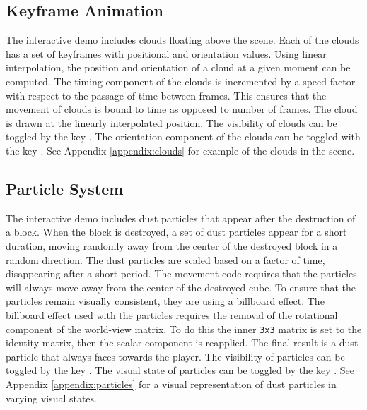 \documentclass[a4paper,11pt,titlepage]{scrartcl}
\begin{document}
\subsection{Keyframe Animation}
\label{section:animation}
The interactive demo includes clouds floating above the scene.  Each of the clouds has a set of keyframes with positional and orientation values.  Using linear interpolation, the position and orientation of a cloud at a given moment can be computed.  The timing component of the clouds is incremented by a speed factor with respect to the passage of time between frames.  This ensures that the movement of clouds is bound to time as opposed to number of frames.  The cloud is drawn at the linearly interpolated position.
\vskip 2.5mm\noindent
The visibility of clouds can be toggled by the key .  The orientation component of the clouds can be toggled with the key .  See Appendix \ref{appendix:clouds} for example of the clouds in the scene.

\subsection{Particle System}
\label{section:particles}
The interactive demo includes dust particles that appear after the destruction of a block.  When the block is destroyed, a set of dust particles appear for a short duration, moving randomly away from the center of the destroyed block in a random direction.  The dust particles are scaled based on a factor of time, disappearing after a short period.  The movement code requires that the particles will always move away from the center of the destroyed cube.  To ensure that the particles remain visually consistent, they are using a billboard effect.  The billboard effect used with the particles requires the removal of the rotational component of the world-view matrix.  To do this the inner \texttt{3x3} matrix is set to the identity matrix, then the scalar component is reapplied.  The final result is a dust particle that always faces towards the player.
\vskip 2.5mm\noindent
The visibility of particles can be toggled by the key .  The visual state of particles can be toggled by the key .  See Appendix \ref{appendix:particles} for a visual representation of dust particles in varying visual states.
\end{document}

